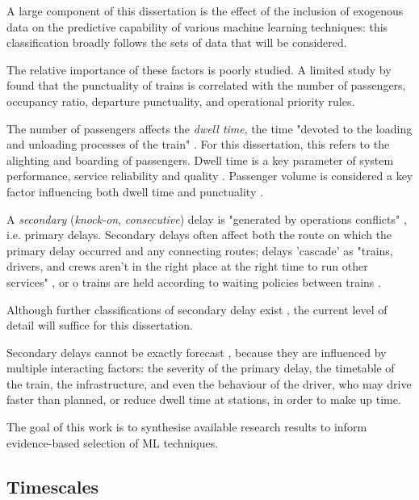 \documentclass{article}
\begin{document}
A large component of this dissertation is the effect of the inclusion of exogenous data on the predictive capability of various machine learning techniques: this classification broadly follows the sets of data that will
be considered. 

The relative importance of these factors is poorly studied. A limited study by \cite{olsson_haugland_2004} found that the punctuality of trains is correlated with the number of passengers, occupancy ratio, departure punctuality, and operational priority rules.

The number of passengers affects the \textit{dwell time}, the time "devoted to the loading and unloading processes of the train" \cite{san_mohd_masirin_2016}. For this dissertation, this refers to the alighting
and boarding of passengers. Dwell time is a key parameter of system performance, service reliability and quality \cite{puong_2000}. Passenger volume is considered a key factor influencing both dwell time \cite{san_mohd_masirin_2016} and punctuality \cite{olsson_haugland_2004}.

A \textit{secondary} (\textit{knock-on}, \textit{consecutive}) delay is "generated by operations conflicts" \cite{cerreto_nielsen_harrod_nielsen_2016}, i.e. primary delays. Secondary delays often affect
both the route on which the primary delay occurred and any connecting routes; delays 'cascade' as "trains, drivers, and crews aren't in the right place at the right time to run other services" \cite{nr_knock_on_delays},
or o trains are held according to waiting policies between trains \cite{berger_et_al_2011}.

Although further classifications of secondary delay exist \cite{daamen_goverde_hansen_2008}, the current level of detail will suffice for this dissertation.

Secondary delays cannot be exactly forecast \cite{berger_et_al_2011}, \cite{milinkovic_markovic_veskovic_ivic_pavlovic_2013} because they are influenced by multiple interacting factors: the severity of the primary delay, the timetable of the train, the infrastructure, and even the behaviour of the driver, who may drive faster than planned, or reduce dwell time at stations, in order to make up time.

The goal of this work is to synthesise available research results to inform evidence-based selection of ML techniques.

\subsection{Timescales}
\end{document}
